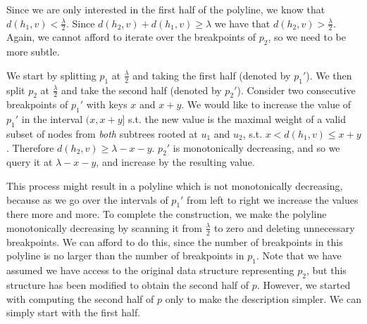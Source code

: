 \documentclass[11pt,a4paper]{article}
\theoremstyle{definition}
\theoremstyle{remark}
\begin{document}
\vspace{0.04in}  Since we are only interested in the first half of the polyline, we know that $d(h_1,v) < \frac{\lambda}{2}$. Since $d(h_2,v) +d(h_1,v)\geq \lambda$ we have that  $d(h_2,v) > \frac{\lambda}{2}$. Again, we cannot afford to iterate over the breakpoints of $p_2$, so we need to be more subtle.

We start by splitting $p_1$ at $\frac{\lambda}{2}$ and taking the first half (denoted by $p_1'$). We then split $p_2$ at $\frac{\lambda}{2}$
and take the second half (denoted by $p_2'$). Consider two consecutive breakpoints of $p_1'$ with keys $x$ and $x+y$. We would like to increase the value of $p_1'$ in the interval $(x,x+y]$ s.t. the new value is the maximal weight of a valid subset of nodes from \emph{both} subtrees rooted at $u_1$ and $u_2$, s.t. $x < d(h_1,v) \leq x+y$. Therefore $d(h_2,v) \ge \lambda-x-y$. $p_2'$ is monotonically decreasing, and so we query it at $\lambda-x-y$, and increase by the resulting value.

This process might result in a polyline which is not monotonically decreasing, because as we go over the intervals of $p_1'$ from left to right we increase the values there more and more.
To complete the construction, we make the polyline monotonically decreasing by scanning it from $\frac{\lambda}{2}$ to zero and deleting unnecessary breakpoints. We can afford to do this, since the number of breakpoints in this polyline is no larger than the number of breakpoints in $p_1$.
%
Note that we have assumed we have access to the original data structure representing $p_{2}$, but this structure has been  modified to obtain the second half of $p$. However, we started with computing the second half of $p$ only to make the description simpler. We can simply start with the first half.
\end{document}
